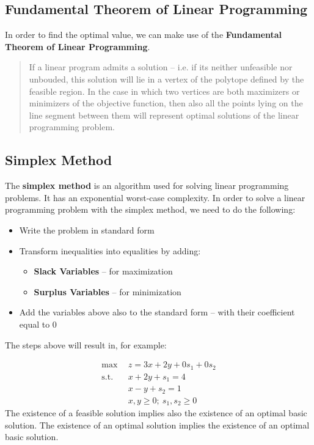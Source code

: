 \documentclass{article}
\begin{document}
\subsection{Fundamental Theorem of Linear Programming}
In order to find the optimal value, we can make use of the \textbf{Fundamental Theorem of Linear Programming}.

\blockquote{
If a linear program admits a solution -- i.e. if its neither unfeasible nor unbouded, this solution will lie in a vertex of the polytope defined by the feasible region. In the case in which two vertices are both maximizers or minimizers of the objective function, then also all the points lying on the line segment between them will represent optimal solutions of the linear programming problem.}

\subsection{Simplex Method}
The \textbf{simplex method} is an algorithm used for solving linear programming problems. It has an exponential worst-case complexity. In order to solve a linear programming problem with the simplex method, we need to do the following:

\begin{itemize}
	\item Write the problem in standard form
	\item Transform inequalities into equalities by adding:
	\begin{itemize}
		\item \textbf{Slack Variables} -- for maximization
		\item \textbf{Surplus Variables} -- for minimization
	\end{itemize}
	\item Add the variables above also to the standard form -- with their coefficient equal to 0
\end{itemize}
The steps above will result in, for example:

\begin{align*}
	\max~~ & z = 3x+2y+0s_1+0s_2 \\
	\text{s.t.}~~ & x+2y+s_1 = 4 \\
	~~& x-y+s_2 = 1 \\
	~~& x,y \geq 0;~ s_1, s_2 \geq 0
\end{align*}
The existence of a feasible solution implies also the existence of an optimal basic solution. The existence of an optimal solution implies the existence of an optimal basic solution.
\end{document}

